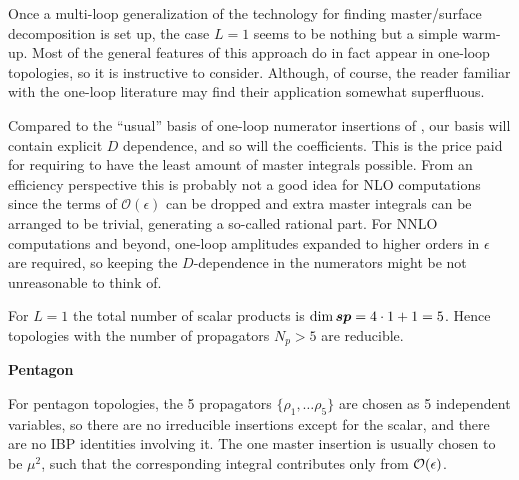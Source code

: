 Once a multi-loop generalization of the technology for finding master/surface decomposition 
is set up, the case $L=1$ seems to be nothing but a simple warm-up. 
Most of the general features of this approach do in fact appear in one-loop topologies,
so it is instructive to consider.
Although, of course, the reader familiar with the one-loop literature may find
their application somewhat superfluous.

Compared to the ``usual'' basis of one-loop numerator insertions of \cite{Ossola:2006us,Giele:2008ve},
our basis will contain explicit $D$ dependence, and so will the coefficients.
This is the price paid for requiring to have the least amount of master integrals possible.
From an efficiency perspective this is probably not a good idea for NLO computations
since the terms of $\mathcal{O}(\epsilon)$ can be dropped
and extra master integrals can be arranged to be trivial, generating a so-called rational part.
For NNLO computations and beyond, one-loop amplitudes expanded to higher orders in $\epsilon$ are required, 
so keeping the $D$-dependence in the numerators might be not unreasonable to think of.

For $L=1$ the total number of scalar products is $\dim{\vb*{sp}} = 4\cdot 1+ 1 = 5$.
Hence topologies with the number of propagators $N_p>5$ are reducible.


\textbf{Pentagon}

For pentagon topologies, the 5 propagators $\{\rho_1,\ldots{}\rho_5\}$ are chosen as 5 independent variables,
so there are no irreducible insertions except for the scalar, and there are no IBP identities involving it. 
The one master insertion is usually chosen to be $\mu^2$, such that
the corresponding integral contributes only from  $\order{\epsilon}$.


